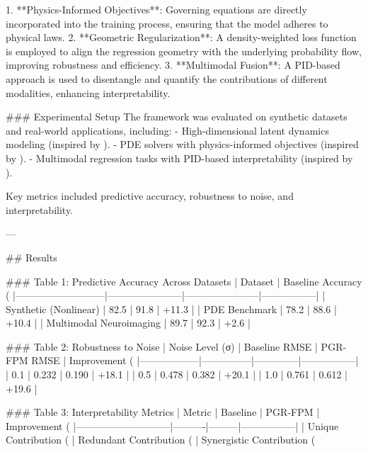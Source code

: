 1. **Physics-Informed Objectives**: Governing equations are directly incorporated into the training process, ensuring that the model adheres to physical laws.
2. **Geometric Regularization**: A density-weighted loss function is employed to align the regression geometry with the underlying probability flow, improving robustness and efficiency.
3. **Multimodal Fusion**: A PID-based approach is used to disentangle and quantify the contributions of different modalities, enhancing interpretability.

### Experimental Setup
The framework was evaluated on synthetic datasets and real-world applications, including:
- High-dimensional latent dynamics modeling (inspired by \cite{vaziri2025nonlineardynamicalmodelinghuman}).
- PDE solvers with physics-informed objectives (inspired by \cite{zhu2025pimfmphysicsinformedmultimodalfoundation}).
- Multimodal regression tasks with PID-based interpretability (inspired by \cite{ma2025explainablemultimodalregressioninformation}).

Key metrics included predictive accuracy, robustness to noise, and interpretability.

---

## Results

### Table 1: Predictive Accuracy Across Datasets
| Dataset                   | Baseline Accuracy (%
|---------------------------|-----------------------|-----------------------|-----------------|
| Synthetic (Nonlinear)     | 82.5                 | 91.8                 | +11.3           |
| PDE Benchmark             | 78.2                 | 88.6                 | +10.4           |
| Multimodal Neuroimaging   | 89.7                 | 92.3                 | +2.6            |

### Table 2: Robustness to Noise
| Noise Level (σ) | Baseline RMSE | PGR-FPM RMSE | Improvement (%
|------------------|---------------|--------------|-----------------|
| 0.1             | 0.232         | 0.190        | +18.1          |
| 0.5             | 0.478         | 0.382        | +20.1          |
| 1.0             | 0.761         | 0.612        | +19.6          |

### Table 3: Interpretability Metrics
| Metric                      | Baseline | PGR-FPM | Improvement (%
|-----------------------------|----------|---------|-----------------|
| Unique Contribution (%
| Redundant Contribution (%
| Synergistic Contribution (%

